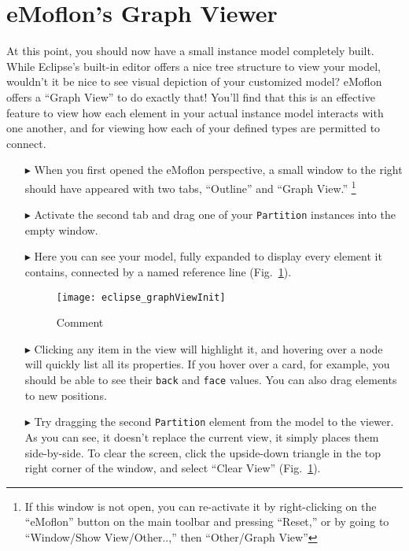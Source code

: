 \newpage
\section{eMoflon's Graph Viewer}
\genHeader
\hypertarget{sec:Graph View}{}

At this point, you should now have a small instance model completely built. While Eclipse's built-in editor offers a nice tree structure to view your model,
wouldn't it be nice to see visual depiction of your customized model? eMoflon offers a ``Graph View'' to do exactly that! You'll find that this is an effective
feature to view how each element in your actual instance model interacts with one another, and for viewing how each of your defined types are permitted to connect.

\begin{itemize}

\item[$\blacktriangleright$] When you first opened the eMoflon perspective, a small window to the right should have appeared with two tabs, ``Outline'' and
``Graph View.'' \footnote{If this window is not open, you can re-activate it by right-clicking on the ``eMoflon'' button on the main toolbar and pressing
``Reset,'' or by going to ``Window/Show View/Other..,'' then ``Other/Graph View''} 

\item[$\blacktriangleright$] Activate the second tab and drag one of your \texttt{Partition} instances into the empty window. 

\item[$\blacktriangleright$] Here you can see your model, fully expanded to display every element it contains, connected by a named reference line
(Fig.~\ref{fig:graphView_init}).

\begin{figure}[htbp]
	\centering
  \texttt{[image: eclipse\_graphViewInit]}
	\caption{Comment}
	\label{fig:graphView_init}
\end{figure}

\item[$\blacktriangleright$] Clicking any item in the view will highlight it, and hovering over a node will quickly list all its properties. If you hover
over a card, for example, you should be able to see their \texttt{back} and \texttt{face} values. You can also drag elements to new positions.

\clearpage

\item[$\blacktriangleright$] Try dragging the second \texttt{Partition} element from the model to the viewer. As you can see, it doesn't replace the current
view, it simply places them side-by-side. To clear the screen, click the upside-down triangle in the top right corner of the window, and select ``Clear View''
(Fig.~\ref{fig:graphView_init}).


\end{itemize}
